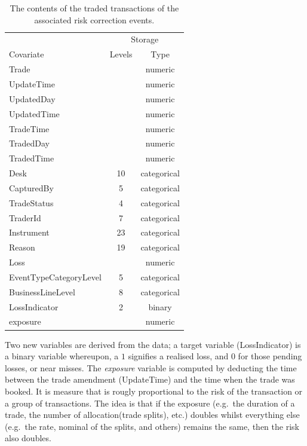 \documentclass[]{DissertateUSU}
\begin{document}
\begin{table}[ht]
\centering
\caption{The contents of the traded transactions of the associated risk correction events.}
\begin{tabular}{lcc}
\toprule
  & \multicolumn{2}{c}{Storage} \\
Covariate     & Levels   & Type \\ 
\midrule
 Trade       &          & numeric \\
 UpdateTime  &          & numeric \\
 UpdatedDay  &          & numeric \\
 UpdatedTime &          & numeric \\
 TradeTime   &          & numeric \\
 TradedDay   &          & numeric \\
 TradedTime  &          & numeric \\
 Desk        &  10      & categorical \\
 CapturedBy  &  5       & categorical \\
 TradeStatus &  4       & categorical \\
 TraderId    &  7       & categorical \\
 Instrument  &  23      & categorical \\
 Reason      &  19      & categorical \\
 Loss        &          & numeric \\
 EventTypeCategoryLevel & 5  & categorical \\
 BusinessLineLevel      & 8  & categorical \\
 LossIndicator          & 2  & binary \\
 exposure               &    & numeric \\
 \bottomrule
\end{tabular}\label{tab_contents}
\end{table}

Two new variables are derived from the data; a target variable
(LossIndicator) is a binary variable whereupon, a \(1\) signifies a
realised loss, and \(0\) for those pending losses, or near misses. The
\emph{exposure} variable is computed by deducting the time between the
trade amendment (UpdateTime) and the time when the trade was booked. It
is measure that is rougly proportional to the risk of the transaction or
a group of transactions. The idea is that if the exposure (e.g.~the
duration of a trade, the number of allocation(trade splits), etc.)
doubles whilst everything else (e.g.~the rate, nominal of the splits,
and others) remains the same, then the risk also doubles.
\end{document}
